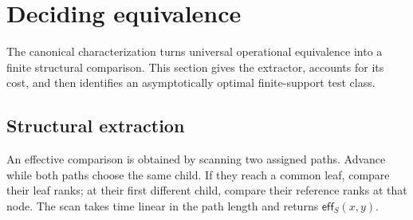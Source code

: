 \section{Deciding equivalence}
\label{sec:deciding-equivalence}

The canonical characterization turns universal operational equivalence into a
finite structural comparison.  This section gives the extractor, accounts for
its cost, and then identifies an asymptotically optimal finite-support test
class.

\subsection{Structural extraction}
\label{sec:structural-decision}

An effective comparison is obtained by scanning two assigned paths.  Advance
while both paths choose the same child.  If they reach a common leaf, compare
their leaf ranks; at their first different child, compare their reference
ranks at that node.  The scan takes time linear in the path length and returns
\(\mathsf{eff}_S(x,y)\).

